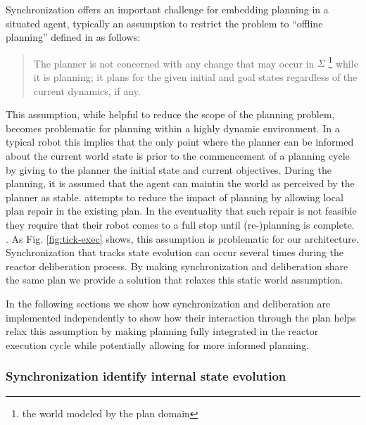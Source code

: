 Synchronization offers an important challenge for embedding planning
in a situated agent, typically %
an assumption to restrict the problem to ``offline planning'' defined
in \cite{ghallab04} as follows:

\begin{quotation}
  The planner is not concerned with any change that may occur in
  $\Sigma$ \footnote{the world modeled by the plan domain} while it is
  planning; it plans for the given initial and goal states regardless
  of the current dynamics, if any. 
\end{quotation}

This assumption, while helpful to reduce the scope of the planning
problem, becomes problematic for planning within a highly dynamic
environment. In a typical robot this implies that the only point where
the planner can be informed about the current world state is prior to
the commencement of a planning cycle by giving to the planner the
initial state and current objectives. During the planning, it is
assumed that the agent can maintin the world as perceived by the
planner as stable. \cite{lemai04, lemai-chenevier2004} attempts to
reduce the impact of planning by allowing local plan repair in the
existing plan. In the eventuality that such repair is not feasible
they require that their robot comes to a full stop until (re-)planning
is complete. . As Fig.
\ref{fig:tick-exec} shows, this assumption is problematic for our
architecture. Synchronization that tracks state evolution can occur
several times during the reactor deliberation process. By making
synchronization and deliberation share the same plan we provide a
solution that relaxes this static world assumption. 

In the following sections we show how synchronization and deliberation
are implemented independently to show how their interaction through
the plan helps relax this assumption by making planning fully
integrated in the reactor execution cycle while potentially allowing
for more informed planning.

\subsubsection{Synchronization identify internal state evolution}
\label{sec:arch:synch}


